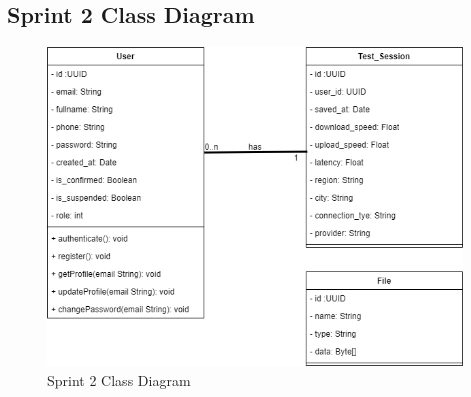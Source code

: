 \subsection{Sprint 2 Class Diagram}
\begin{figure}[H]
   
    
    \includegraphics[width=0.98\textwidth]{images/sprint2/Sprint2ClassDiag.png}
    \caption{Sprint 2 Class Diagram}
    \label{fig:enter-label}
    
\end{figure}
\newpage

